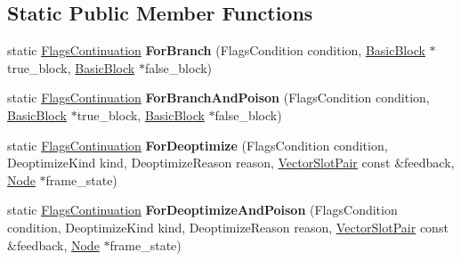 \subsection*{Static Public Member Functions}
\begin{DoxyCompactItemize}
\item 
\mbox{\label{classv8_1_1internal_1_1compiler_1_1FlagsContinuation_a4d658d39436132cd43f8582d3b3954a2}} 
static \mbox{\hyperlink{classv8_1_1internal_1_1compiler_1_1FlagsContinuation}{Flags\+Continuation}} {\bfseries For\+Branch} (Flags\+Condition condition, \mbox{\hyperlink{classv8_1_1internal_1_1compiler_1_1BasicBlock}{Basic\+Block}} $\ast$true\+\_\+block, \mbox{\hyperlink{classv8_1_1internal_1_1compiler_1_1BasicBlock}{Basic\+Block}} $\ast$false\+\_\+block)
\item 
\mbox{\label{classv8_1_1internal_1_1compiler_1_1FlagsContinuation_a05dd03c332730e82492fa46089d8dc21}} 
static \mbox{\hyperlink{classv8_1_1internal_1_1compiler_1_1FlagsContinuation}{Flags\+Continuation}} {\bfseries For\+Branch\+And\+Poison} (Flags\+Condition condition, \mbox{\hyperlink{classv8_1_1internal_1_1compiler_1_1BasicBlock}{Basic\+Block}} $\ast$true\+\_\+block, \mbox{\hyperlink{classv8_1_1internal_1_1compiler_1_1BasicBlock}{Basic\+Block}} $\ast$false\+\_\+block)
\item 
\mbox{\label{classv8_1_1internal_1_1compiler_1_1FlagsContinuation_a8cef1e740b212ec7db7f797d223c739c}} 
static \mbox{\hyperlink{classv8_1_1internal_1_1compiler_1_1FlagsContinuation}{Flags\+Continuation}} {\bfseries For\+Deoptimize} (Flags\+Condition condition, Deoptimize\+Kind kind, Deoptimize\+Reason reason, \mbox{\hyperlink{classv8_1_1internal_1_1VectorSlotPair}{Vector\+Slot\+Pair}} const \&feedback, \mbox{\hyperlink{classv8_1_1internal_1_1compiler_1_1Node}{Node}} $\ast$frame\+\_\+state)
\item 
\mbox{\label{classv8_1_1internal_1_1compiler_1_1FlagsContinuation_a92c9bf4df1df7d971d1770f9ba7f0371}} 
static \mbox{\hyperlink{classv8_1_1internal_1_1compiler_1_1FlagsContinuation}{Flags\+Continuation}} {\bfseries For\+Deoptimize\+And\+Poison} (Flags\+Condition condition, Deoptimize\+Kind kind, Deoptimize\+Reason reason, \mbox{\hyperlink{classv8_1_1internal_1_1VectorSlotPair}{Vector\+Slot\+Pair}} const \&feedback, \mbox{\hyperlink{classv8_1_1internal_1_1compiler_1_1Node}{Node}} $\ast$frame\+\_\+state)

\end{DoxyCompactItemize}
